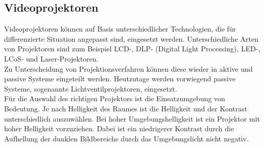 \subsection{Videoprojektoren}
Videoprojektoren können auf Basis unterschiedlicher Technologien, die für differenzierte Situation angepasst sind, eingesetzt werden. Unterschiedliche Arten von Projektoren sind zum Beispiel LCD-, DLP- (Digital Light Processing), LED-, LCoS- und Laser-Projektoren. \\
Zu Unterscheidung von Projektionsverfahren können diese wieder in aktive und passive Systeme eingeteilt werden. Heutzutage werden vorwiegend passive Systeme, sogenannte Lichtventilprojektoren, eingesetzt. \cite[Vgl. Seite 551]{Schmidt.2021} \\
Für die Auswahl des richtigen Projektors ist die Einsatzumgebung von Bedeutung. Je nach Helligkeit des Raumes ist die Helligkeit und der Kontrast unterschiedlich auszuwählen. Bei hoher Umgebungshelligkeit ist ein Projektor mit hoher Helligkeit vorzuziehen. Dabei ist ein niedrigerer Kontrast durch die Aufhellung der dunklen Bildbereiche durch das Umgebungslicht nicht negativ. \cite[Vgl. Seite 562]{Schmidt.2021}

